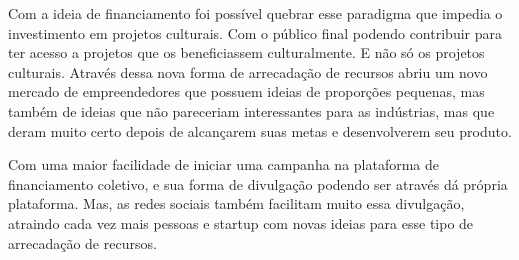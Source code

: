 \documentclass{classe_cn}                 %
\begin{document}
Com a ideia de financiamento foi possível quebrar esse paradigma que impedia o investimento em projetos culturais. Com o público final podendo contribuir para ter acesso a projetos que os beneficiassem culturalmente. E não só os projetos culturais. Através dessa nova forma de arrecadação de recursos abriu um novo mercado de empreendedores que possuem ideias de proporções pequenas, mas também de ideias que não pareceriam interessantes para as indústrias, mas que deram muito certo depois de alcançarem suas metas e desenvolverem seu produto.

Com uma maior facilidade de iniciar uma campanha na plataforma de financiamento coletivo, e sua forma de divulgação podendo ser através dá própria plataforma. Mas, as redes sociais também facilitam muito essa divulgação, atraindo cada vez mais pessoas e startup com novas ideias para esse tipo de arrecadação de recursos.


\vspace{1.0cm}
\end{document}
